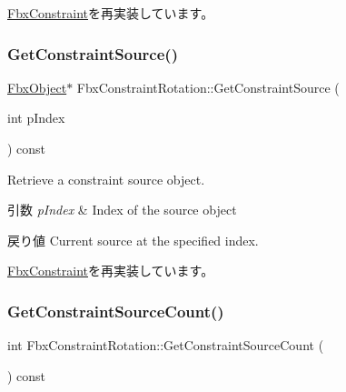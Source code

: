 \hyperlink{class_fbx_constraint_a7f587d5db9685b5ee925a85354263edc}{Fbx\+Constraint}を再実装しています。

\mbox{\label{class_fbx_constraint_rotation_a4bfb008520cb5aa6996104c292e5819e}} 
\subsubsection{\texorpdfstring{Get\+Constraint\+Source()}{GetConstraintSource()}}
{\footnotesize\ttfamily \hyperlink{class_fbx_object}{Fbx\+Object}$\ast$ Fbx\+Constraint\+Rotation\+::\+Get\+Constraint\+Source (\begin{DoxyParamCaption}\item[{int}]{p\+Index }\end{DoxyParamCaption}) const\hspace{0.3cm}{\ttfamily [virtual]}}

Retrieve a constraint source object. 
\begin{DoxyParams}{引数}
{\em p\+Index} & Index of the source object \\
\hline
\end{DoxyParams}
\begin{DoxyReturn}{戻り値}
Current source at the specified index. 
\end{DoxyReturn}


\hyperlink{class_fbx_constraint_a5ff6fe6fc98af1e33e8b297bc1cea007}{Fbx\+Constraint}を再実装しています。

\mbox{\label{class_fbx_constraint_rotation_ab27178d5b53654eb9f41f6e3f3a4c5dc}} 
\subsubsection{\texorpdfstring{Get\+Constraint\+Source\+Count()}{GetConstraintSourceCount()}}
{\footnotesize\ttfamily int Fbx\+Constraint\+Rotation\+::\+Get\+Constraint\+Source\+Count (\begin{DoxyParamCaption}{ }\end{DoxyParamCaption}) const\hspace{0.3cm}{\ttfamily [virtual]}}

